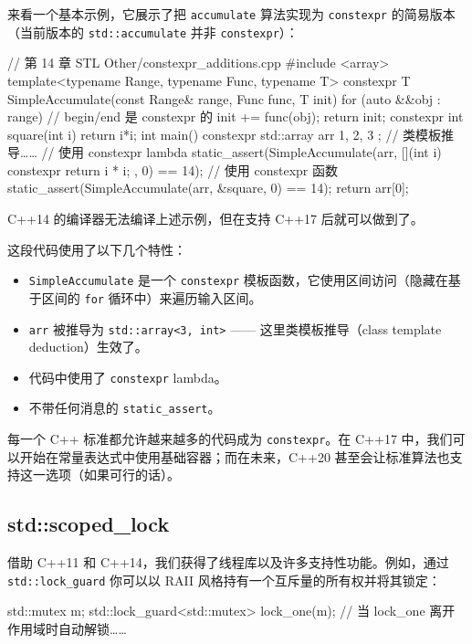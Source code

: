 来看一个基本示例，它展示了把 \texttt{accumulate} 算法实现为 \texttt{constexpr} 的简易版本（当前版本的 \texttt{std::accumulate} 并非 \texttt{constexpr}）：

\begin{codebox}[cpp]
// 第 14 章 STL Other/constexpr_additions.cpp
#include <array>
template<typename Range, typename Func, typename T>
constexpr T SimpleAccumulate(const Range& range, Func func, T init) {
for (auto &&obj : range) { // begin/end 是 constexpr 的
init += func(obj);
}
return init;
}
constexpr int square(int i) { return i*i; }
int main() {
constexpr std::array arr{ 1, 2, 3 }; // 类模板推导……
// 使用 constexpr lambda
static_assert(SimpleAccumulate(arr, [](int i) constexpr {
return i * i;
}, 0) == 14);
// 使用 constexpr 函数
static_assert(SimpleAccumulate(arr, &square, 0) == 14);
return arr[0];
}
\end{codebox}

C++14 的编译器无法编译上述示例，但在支持 C++17 后就可以做到了。

这段代码使用了以下几个特性：

\begin{itemize}
\item \texttt{SimpleAccumulate} 是一个 \texttt{constexpr} 模板函数，它使用区间访问（隐藏在基于区间的 \texttt{for} 循环中）来遍历输入区间。
\item \texttt{arr} 被推导为 \texttt{std::array<3, int>} —— 这里类模板推导（class template deduction）生效了。
\item 代码中使用了 \texttt{constexpr} lambda。
\item 不带任何消息的 \texttt{static\_assert}。
\end{itemize}

每一个 C++ 标准都允许越来越多的代码成为 \texttt{constexpr}。在 C++17 中，我们可以开始在常量表达式中使用基础容器；而在未来，C++20 甚至会让标准算法也支持这一选项（如果可行的话）。


\subsection{std::scoped\_lock}

借助 C++11 和 C++14，我们获得了线程库以及许多支持性功能。例如，通过 \texttt{std::lock\_guard} 你可以以 RAII 风格持有一个互斥量的所有权并将其锁定：

\begin{codebox}[cpp]
std::mutex m;
std::lock_guard<std::mutex> lock_one(m);
// 当 lock_one 离开作用域时自动解锁……
\end{codebox}

